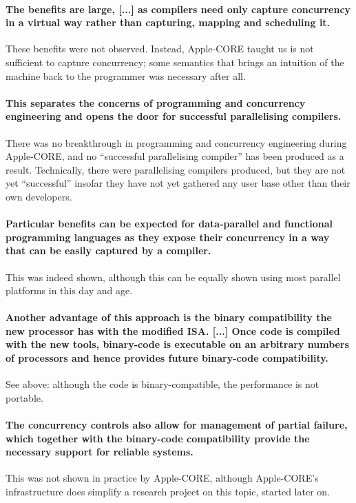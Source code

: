 \paragraph{The benefits are large, [...] as compilers need only capture
concurrency in a virtual way rather than capturing, mapping and
scheduling it.}
These benefits were not observed. Instead, Apple-CORE taught us is not sufficient to capture concurrency;
some semantics that brings an intuition of the machine back to the programmer
was necessary after all.

\paragraph{This separates the
concerns of programming and concurrency engineering and opens the door
for successful parallelising compilers.}  There was no breakthrough in
programming and concurrency engineering during Apple-CORE, and no
``successful parallelising compiler'' has been produced as a
result. Technically, there were parallelising compilers produced, but
they are not yet ``successful'' insofar they have not yet gathered any
user base other than their own developers.

\paragraph{Particular benefits can be expected for data-parallel
and functional programming languages as they expose their concurrency
in a way that can be easily captured by a compiler.}
This was indeed shown, although this can be equally shown using
most parallel platforms in this day and age.

\paragraph{Another advantage
of this approach is the binary compatibility the new processor has
with the modified ISA. [...]  Once code is compiled with the new
tools, binary-code is executable on an arbitrary numbers of processors
and hence provides future binary-code compatibility.} See above: although
the code is binary-compatible, the performance is not portable.

\paragraph{The concurrency controls also allow for management of
partial failure, which together with the binary-code compatibility
provide the necessary support for reliable systems.}  This was
not shown in practice by Apple-CORE, although Apple-CORE's
infrastructure does simplify a research project on this topic,
started later on.

